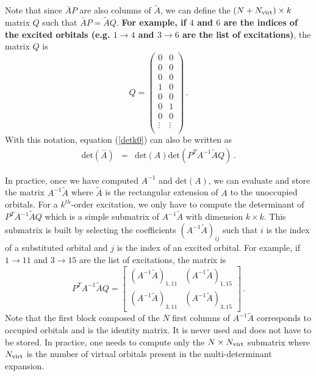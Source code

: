 \documentclass[aip,jcp,reprint,floatfix,onecolumn]{revtex4-1}
\def\det{\text{det}}
\def\A{A}
\def\aa{A^{-1}\tilde{A}}
\begin{document}
Note that since $\bar{A}P$  are also  columns of $\tilde{A}$, we can define the $(N+ N_{\rm virt})\times k$ matrix $Q$ such that $\bar{A}P = \tilde{A} Q$.
{\bf For example, if $4$ and $6$ are the indices of the excited orbitals (e.g. $1 \to 4$ and $3 \to 6$ are the list of excitations)}, the matrix $Q$ is
\begin{equation}
Q = \left( \begin{array}{cccccc}
0 & 0  \\
0 & 0  \\
0 & 0  \\
1 & 0  \\
0 & 0  \\
0 & 1  \\
0 & 0  \\
\vdots & \vdots \\
\end{array} \right)\,.
\end{equation}
With this notation, equation (\ref{detk0}) can also be written as
\begin{eqnarray}
\det (\bar{\A})  & = & \det (\A)  \det (P^T \A^{-1} \tilde{\A} Q) \,.
\label{detk}
\end{eqnarray}

In practice,  once we have  computed $\A^{-1}$ and $\det(A)$, we can evaluate and store the matrix   $\A^{-1} \tilde{A}$ where $\tilde{A}$ is the rectangular extension of $A$ to the unoccupied orbitals.
For a $k^{th}$-order excitation, we only have to compute the determinant of
 $P^T \A^{-1}  \tilde{\A}Q$ which is a simple submatrix of $A^{-1}\tilde{A}$ with  dimension $k\times k$. This submatrix is built
by selecting the coefficients $(\aa)_{ij}$ such that   $i$ is the index of  a substituted orbital and $j$ is the index of an excited orbital.
For example, if $1 \to 11$ and $3 \to 15$ are the list of excitations,
the matrix is
\begin{equation}
P^T A^{-1}\tilde{A}Q = \left[\begin{matrix} (\aa)_{1,11} & (\aa)_{1,15}   \\
                      (\aa)_{3,11} & (\aa)_{3,15}
\end{matrix} \right]\,.
\end{equation}
Note that the first block composed of the $N$ first columns of $\A^{-1} \tilde{A}$ corresponds to occupied orbitals and is the identity matrix. It is never used and does not have to be stored. In practice, one needs to compute only the $N\times N_{\rm virt}$ submatrix where $N_{\rm virt}$ is the number of virtual orbitals present in the multi-determinant expansion.
\end{document}
